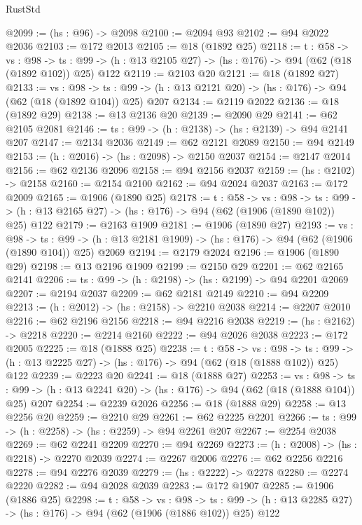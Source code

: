 \begin{lexlean}{RustStd}
\begin{coremodule}
@2099 := (hs : @96) -> @2098
@2100 := @2094 @93
@2102 := @94 @2022 @2036
@2103 := @172 @2013
@2105 := @18 (@1892 @25)
@2118 := {t : @58} ->
  {vs : @98} ->
  {ts : @99} -> (h : @13 @2105 @27) -> (hs : @176) -> @94 (@62 (@18 (@1892 @102)) @25) @122
@2119 := @2103 @20
@2121 := @18 (@1892 @27)
@2133 := {vs : @98} ->
  {ts : @99} -> (h : @13 @2121 @20) -> (hs : @176) -> @94 (@62 (@18 (@1892 @104)) @25) @207
@2134 := @2119 @2022
@2136 := @18 (@1892 @29)
@2138 := @13 @2136 @20
@2139 := @2090 @29
@2141 := @62 @2105 @2081
@2146 := {ts : @99} -> (h : @2138) -> (hs : @2139) -> @94 @2141 @207
@2147 := @2134 @2036
@2149 := @62 @2121 @2089
@2150 := @94 @2149
@2153 := (h : @2016) -> (hs : @2098) -> @2150 @2037
@2154 := @2147 @2014
@2156 := @62 @2136 @2096
@2158 := @94 @2156 @2037
@2159 := (hs : @2102) -> @2158
@2160 := @2154 @2100
@2162 := @94 @2024 @2037
@2163 := @172 @2009
@2165 := @1906 (@1890 @25)
@2178 := {t : @58} ->
  {vs : @98} ->
  {ts : @99} -> (h : @13 @2165 @27) -> (hs : @176) -> @94 (@62 (@1906 (@1890 @102)) @25) @122
@2179 := @2163 @1909
@2181 := @1906 (@1890 @27)
@2193 := {vs : @98} ->
  {ts : @99} -> (h : @13 @2181 @1909) -> (hs : @176) -> @94 (@62 (@1906 (@1890 @104)) @25) @2069
@2194 := @2179 @2024
@2196 := @1906 (@1890 @29)
@2198 := @13 @2196 @1909
@2199 := @2150 @29
@2201 := @62 @2165 @2141
@2206 := {ts : @99} -> (h : @2198) -> (hs : @2199) -> @94 @2201 @2069
@2207 := @2194 @2037
@2209 := @62 @2181 @2149
@2210 := @94 @2209
@2213 := (h : @2012) -> (hs : @2158) -> @2210 @2038
@2214 := @2207 @2010
@2216 := @62 @2196 @2156
@2218 := @94 @2216 @2038
@2219 := (hs : @2162) -> @2218
@2220 := @2214 @2160
@2222 := @94 @2026 @2038
@2223 := @172 @2005
@2225 := @18 (@1888 @25)
@2238 := {t : @58} ->
  {vs : @98} ->
  {ts : @99} -> (h : @13 @2225 @27) -> (hs : @176) -> @94 (@62 (@18 (@1888 @102)) @25) @122
@2239 := @2223 @20
@2241 := @18 (@1888 @27)
@2253 := {vs : @98} ->
  {ts : @99} -> (h : @13 @2241 @20) -> (hs : @176) -> @94 (@62 (@18 (@1888 @104)) @25) @207
@2254 := @2239 @2026
@2256 := @18 (@1888 @29)
@2258 := @13 @2256 @20
@2259 := @2210 @29
@2261 := @62 @2225 @2201
@2266 := {ts : @99} -> (h : @2258) -> (hs : @2259) -> @94 @2261 @207
@2267 := @2254 @2038
@2269 := @62 @2241 @2209
@2270 := @94 @2269
@2273 := (h : @2008) -> (hs : @2218) -> @2270 @2039
@2274 := @2267 @2006
@2276 := @62 @2256 @2216
@2278 := @94 @2276 @2039
@2279 := (hs : @2222) -> @2278
@2280 := @2274 @2220
@2282 := @94 @2028 @2039
@2283 := @172 @1907
@2285 := @1906 (@1886 @25)
@2298 := {t : @58} ->
  {vs : @98} ->
  {ts : @99} -> (h : @13 @2285 @27) -> (hs : @176) -> @94 (@62 (@1906 (@1886 @102)) @25) @122

\end{coremodule}
\end{lexlean}
